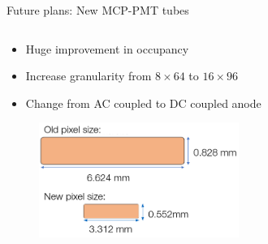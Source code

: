 \documentclass[xcolor={dvipsnames}]{beamer}
\begin{document}
\begin{frame}{Future plans: New MCP-PMT tubes}
  \begin{columns}
    \begin{column}{0.6\textwidth}
      \begin{itemize}
        \setlength\itemsep{1.0em}
        \item{Huge improvement in occupancy}
        \item{Increase granularity from $8\times 64$ to $16\times 96$}
        \item{Change from AC coupled to DC coupled anode}
      \end{itemize}
      \vspace{0.0cm}
      \begin{figure}
        \centering
        \includegraphics[width = 0.7\textwidth]{Figs/NewMCPSizeComparison.png}
      \end{figure}
    \end{column}
    \begin{column}{0.4\textwidth}
      \begin{figure}
        \centering

\end{figure}
\end{column}
\end{columns}
\end{frame}
\end{document}
